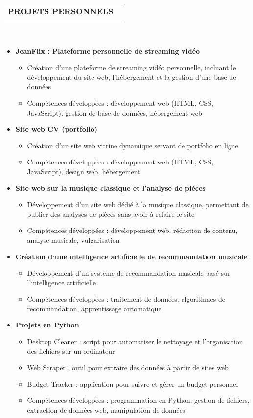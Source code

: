 \documentclass[letterpaper,11pt]{article}
\makeatletter
\newcommand{\ressubheading}[4]{
\begin{tabular*}{6.5in}{l@{\cftdotfill{\cftsecdotsep}\extracolsep{\fill}}r}
		\textbf{#1} & #2 \\
		\textit{#3} & \textit{#4} \\
\end{tabular*}\vspace{-6pt}}
\makeatother
\begin{document}
\ressubheading{PROJETS PERSONNELS}{}{}{}\\
\vspace{-0.5cm}
\begin{itemize}[label={}]
\item \textbf{JeanFlix : Plateforme personnelle de streaming vidéo}
\begin{itemize}
\item Création d'une plateforme de streaming vidéo personnelle, incluant le développement du site web, l'hébergement et la gestion d'une base de données
\item Compétences développées : développement web (HTML, CSS, JavaScript), gestion de base de données, hébergement web
\end{itemize}

\item \textbf{Site web CV (portfolio)}
\begin{itemize}
\item Création d'un site web vitrine dynamique servant de portfolio en ligne
\item Compétences développées : développement web (HTML, CSS, JavaScript), design web, hébergement
\end{itemize}

\item \textbf{Site web sur la musique classique et l'analyse de pièces}
\begin{itemize}
\item Développement d'un site web dédié à la musique classique, permettant de publier des analyses de pièces sans avoir à refaire le site
\item Compétences développées : développement web, rédaction de contenu, analyse musicale, vulgarisation
\end{itemize}

\item \textbf{Création d'une intelligence artificielle de recommandation musicale}
\begin{itemize}
\item Développement d'un système de recommandation musicale basé sur l'intelligence artificielle
\item Compétences développées : traitement de données, algorithmes de recommandation, apprentissage automatique
\end{itemize}

\item \textbf{Projets en Python}
\begin{itemize}
\item Desktop Cleaner : script pour automatiser le nettoyage et l'organisation des fichiers sur un ordinateur
\item Web Scraper : outil pour extraire des données à partir de sites web
\item Budget Tracker : application pour suivre et gérer un budget personnel
\item Compétences développées : programmation en Python, gestion de fichiers, extraction de données web, manipulation de données
\end{itemize}


\end{itemize}
\end{document}
